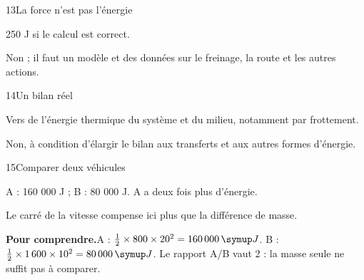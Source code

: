 \par\noindent\begin{minipage}{\linewidth}
\begin{corrige}{13}{La force n’est pas l’énergie}
\begin{questions}
\item 250 J si le calcul est correct.
\item Non ; il faut un modèle et des données sur le freinage, la route et les autres actions.
\end{questions}
\end{corrige}
\end{minipage}
\par\noindent\begin{minipage}{\linewidth}
\begin{corrige}{14}{Un bilan réel}
\begin{questions}
\item Vers de l’énergie thermique du système et du milieu, notamment par frottement.
\item Non, à condition d’élargir le bilan aux transferts et aux autres formes d’énergie.
\end{questions}
\end{corrige}
\end{minipage}
\par\noindent\begin{minipage}{\linewidth}
\begin{corrige}{15}{Comparer deux véhicules}
\begin{questions}
\item A : 160 000 J ; B : 80 000 J. A a deux fois plus d’énergie.
\item Le carré de la vitesse compense ici plus que la différence de masse.
\end{questions}
\par\smallskip\noindent\textbf{Pour comprendre.}\enspace A : $\frac12\times800\times20^2=160\,000\unite J$. B : $\frac12\times1\,600\times10^2=80\,000\unite J$. Le rapport A/B vaut 2 : la masse seule ne suffit pas à comparer.\par
{}
\end{corrige}
\end{minipage}
